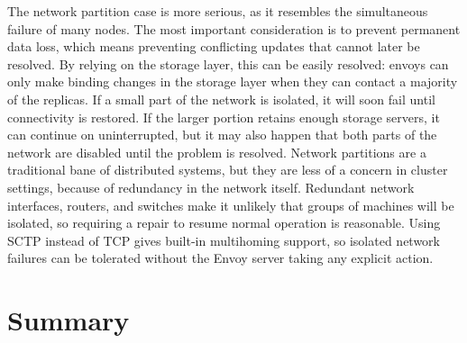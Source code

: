 The network partition case is more serious, as it resembles the simultaneous failure of many nodes. The most important consideration is to prevent permanent data loss, which means preventing conflicting updates that cannot later be resolved. By relying on the storage layer, this can be easily resolved: envoys can only make binding changes in the storage layer when they can contact a majority of the replicas. If a small part of the network is isolated, it will soon fail until connectivity is restored. If the larger portion retains enough storage servers, it can continue on uninterrupted, but it may also happen that both parts of the network are disabled until the problem is resolved. Network partitions are a traditional bane of distributed systems, but they are less of a concern in cluster settings, because of redundancy in the network itself. Redundant network interfaces, routers, and switches make it unlikely that groups of machines will be isolated, so requiring a repair to resume normal operation is reasonable. Using SCTP \cite{stewart} instead of TCP gives built-in multihoming support, so isolated network failures can be tolerated without the Envoy server taking any explicit action.

\section{Summary}

% 
